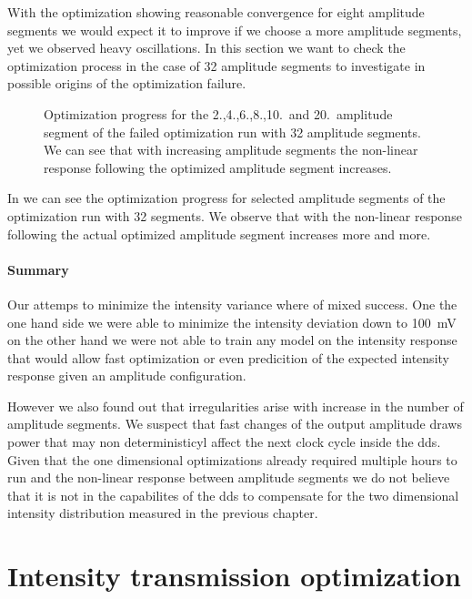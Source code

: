 With the optimization showing reasonable convergence for eight amplitude
segments we would expect it to improve if we choose a more amplitude segments,
yet we observed heavy oscillations. In this section we want to check the
optimization process in the case of \num{32} amplitude segments to investigate
in possible origins of the optimization failure.
\begin{figure}[htb]
  \centering
  \begin{adjustbox}{width=\textwidth}
  \end{adjustbox}
  \caption{Optimization progress for the 2.,4.,6.,8.,10.\ and 20.\ amplitude
    segment of the failed optimization run with 32 amplitude segments. We can
    see that with increasing amplitude segments the non-linear response
    following the optimized amplitude segment increases.
  }\label{fig:intensity_optimization_failure}
\end{figure}
In  we can see the optimization
progress for selected amplitude segments of the optimization run with 32
segments. We observe that with the non-linear response following the actual
optimized amplitude segment increases more and more.

\subsubsection{Summary}

Our attemps to minimize the intensity variance where of mixed success. One
the one hand side we were able to minimize the intensity deviation down
to \SI{100}{\milli\volt} on the other hand we were not able to train any
model on the intensity response that would allow fast optimization or even
predicition of the expected intensity response given an amplitude
configuration.

However we also found out that irregularities arise with increase in the
number of amplitude segments. We suspect that fast changes of the output
amplitude draws power that may non deterministicyl affect the next clock
cycle inside the \gls{dds}. Given that the one dimensional optimizations
already required multiple hours to run and the non-linear response between
amplitude segments we do not believe that it is not in the capabilites of the
\gls{dds} to compensate for the two dimensional intensity distribution
measured in the previous chapter.
\chapter{Intensity transmission optimization}

